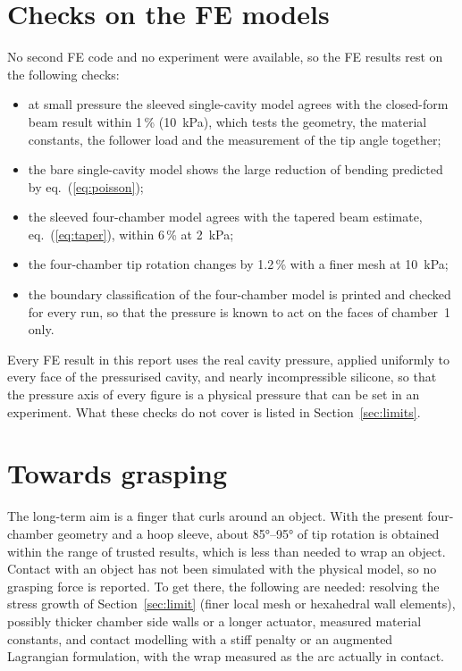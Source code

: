 \documentclass[12pt,a4paper,oneside]{report}
\numberwithin{equation}{chapter}
\numberwithin{figure}{chapter}
\numberwithin{table}{chapter}
\begin{document}
\section{Checks on the FE models}
No second FE code and no experiment were available, so the FE results rest on the following checks:
\begin{itemize}
\item at small pressure the sleeved single-cavity model agrees with the closed-form beam result within 1\,\%
(\SI{10}{kPa}), which tests the geometry, the material constants, the follower load and the measurement of the
tip angle together;
\item the bare single-cavity model shows the large reduction of bending predicted by eq.~(\ref{eq:poisson});
\item the sleeved four-chamber model agrees with the tapered beam estimate, eq.~(\ref{eq:taper}), within 6\,\%
at \SI{2}{kPa};
\item the four-chamber tip rotation changes by 1.2\,\% with a finer mesh at \SI{10}{kPa};
\item the boundary classification of the four-chamber model is printed and checked for every run, so that the
pressure is known to act on the faces of chamber~1 only.
\end{itemize}
Every FE result in this report uses the real cavity pressure, applied uniformly to every face of the
pressurised cavity, and nearly incompressible silicone, so that the pressure axis of every figure is a
physical pressure that can be set in an experiment. What these checks do not cover is listed in
Section~\ref{sec:limits}.

\section{Towards grasping}\label{sec:grasp}
The long-term aim is a finger that curls around an object. With the present four-chamber geometry and a hoop
sleeve, about \ang{85}--\ang{95} of tip rotation is obtained within the range of trusted results, which is
less than needed to wrap an object. Contact with an object has not been simulated with the physical model,
so no grasping force is reported. To get there, the following are needed: resolving the stress growth of
Section~\ref{sec:limit} (finer local mesh or hexahedral wall elements), possibly thicker chamber side walls or a
longer actuator, measured material constants, and contact modelling with a stiff penalty or an augmented
Lagrangian formulation, with the wrap measured as the arc actually in contact.
\end{document}

